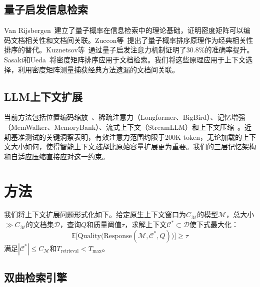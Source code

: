 \documentclass[journal]{IEEEtran}
\begin{document}
\subsection{量子启发信息检索}

Van Rijsbergen~\cite{vanrijsbergen2004}建立了量子概率在信息检索中的理论基础，证明密度矩阵可以编码文档相关性和文档间关联。Zuccon等~\cite{zuccon2009}提出了量子概率排序原理作为经典相关性排序的替代。Kuznetsov等~\cite{kuznetsov2026qisa}通过量子启发注意力机制证明了30.8\%的准确率提升。Sasaki和Ueda~\cite{sasaki2023quantumctx}将密度矩阵排序应用于文档检索。我们将这些原理应用于上下文选择，利用密度矩阵测量捕获经典方法遗漏的文档间关联。

\subsection{LLM上下文扩展}

当前方法包括位置编码缩放~\cite{peng2024yarn}、稀疏注意力（Longformer、BigBird）、记忆增强（MemWalker、MemoryBank）、流式上下文（StreamLLM）和上下文压缩~\cite{jiang2024longllmlingua,li2026ata,su2025enhancingrag}。近期基准测试的关键洞察表明，有效注意力范围约限于200K token，无论加载的上下文大小如何，使得智能上下文\emph{选择}比原始容量扩展更为重要。我们的三层记忆架构和自适应压缩直接应对这一约束。


\section{方法}
\label{sec:method}

我们将上下文扩展问题形式化如下。给定原生上下文窗口为$C_{\mathcal{M}}$的模型$\mathcal{M}$，总大小$\gg C_{\mathcal{M}}$的文档集$\mathcal{D}$，查询$Q$和质量阈值$\tau$，求解上下文$\mathcal{C}^{*} \subset \mathcal{D}$使下式最大化：
\begin{equation}
  \mathbb{E}\!\bigl[\mathrm{Quality}\bigl(\mathrm{Response}(\mathcal{M},
    \mathcal{C}^{*}, Q)\bigr)\bigr] \geq \tau
  \label{eq:objective}
\end{equation}
满足$|\mathcal{C}^{*}| \leq C_{\mathcal{M}}$和$T_{\mathrm{retrieval}} < T_{\max}$。

\subsection{双曲检索引擎}
\label{sec:hyperbolic}
\end{document}
